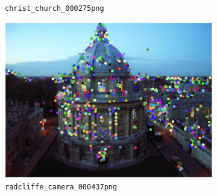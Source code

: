 \documentclass[a4paper,10pt,twoside]{article}
\begin{document}
\begin{figure}
\begin{subfigure}{0.49\textwidth}
    \caption{\texttt{christ\_church\_000275png}}
    \label{sfig:cc275}
  \end{subfigure}
  \begin{subfigure}{0.49\textwidth}
    \centering
    \includegraphics[width=\textwidth,height=.3\textheight,keepaspectratio]{randomimage5}
    \caption{\texttt{radcliffe\_camera\_000437png}}
    \label{sfig:rc437}
  \end{subfigure}
  \begin{subfigure}{0.49\textwidth}
    \centering

\end{subfigure}
\end{figure}
\end{document}
